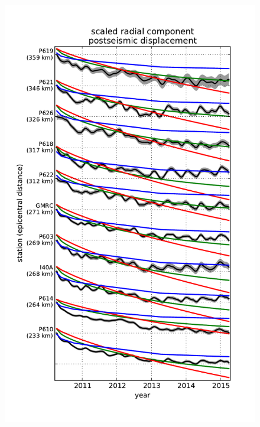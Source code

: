 \documentclass[12pt]{article}
\begin{document}
\begin{figure}
\includegraphics[scale=0.9]{Figures/far_field_final_record_section}
\centering 
\caption{}
\label{ShearRatio}
\end{figure} 
\end{document}
